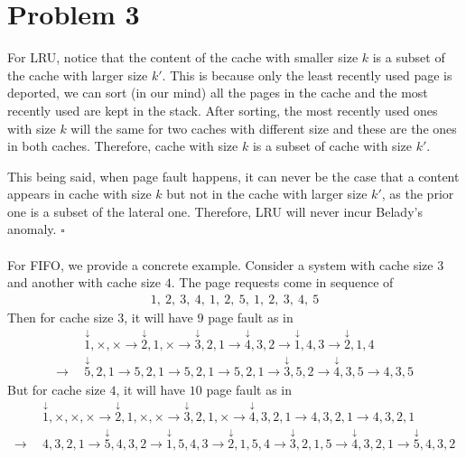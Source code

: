 \documentclass[12pt]{article}
\begin{document}
\section*{Problem 3}
For LRU, notice that the content of the cache with smaller size $k$ is a subset of the cache with larger size $k'$. This is because only the least recently used page is deported, we can sort (in our mind) all the pages in the cache and the most recently used are kept in the stack. After sorting, the most recently used ones with size $k$ will the same for two caches with different size and these are the ones in both caches. Therefore, cache with size $k$ is a subset of cache with size $k'$. 

This being said, when page fault happens, it can never be the case that a content appears in cache with size $k$ but not in the cache with larger size $k'$, as the prior one is a subset of the lateral one. Therefore, LRU will never incur Belady’s anomaly. $\square$
~\\
~\\

For FIFO, we provide a concrete example. Consider a system with cache size $3$ and another with cache size $4$. The page requests come in sequence of 
\begin{align*}
1, \: 2, \: 3, \: 4, \: 1, \: 2, \: 5, \: 1, \: 2, \: 3, \: 4, \: 5
\end{align*}
Then for cache size $3$, it will have $9$ page fault as in
\begin{align*}
&\overset{\downarrow}{1}, \times, \times \to \overset{\downarrow}{2}, 1, \times \to \overset{\downarrow}{3}, 2, 1 \to \overset{\downarrow}{4}, 3, 2 \to \overset{\downarrow}{1}, 4, 3 \to \overset{\downarrow}{2}, 1, 4 \\
\to \:\:& \overset{\downarrow}{5}, 2, 1 \to 5, 2, 1 \to 5, 2, 1 \to 5, 2, 1 \to \overset{\downarrow}{3}, 5, 2 \to \overset{\downarrow}{4}, 3, 5 \to 4, 3, 5
\end{align*}
But for cache size $4$, it will have $10$ page fault as in
\begin{align*}
&\overset{\downarrow}{1}, \times, \times, \times \to \overset{\downarrow}{2}, 1, \times, \times \to \overset{\downarrow}{3}, 2, 1, \times \to \overset{\downarrow}{4}, 3, 2, 1 \to 4, 3, 2, 1 \to 4, 3, 2, 1 \\
\to \:\:& 4, 3, 2, 1 \to \overset{\downarrow}{5}, 4, 3, 2 \to \overset{\downarrow}{1}, 5, 4, 3 \to \overset{\downarrow}{2}, 1, 5, 4 \to \overset{\downarrow}{3}, 2, 1, 5 \to \overset{\downarrow}{4}, 3, 2, 1 \to \overset{\downarrow}{5}, 4, 3, 2
\end{align*}
\end{document}
